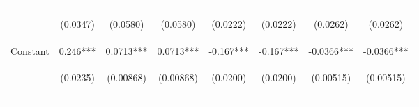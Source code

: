 \documentclass[]{article}
\begin{document}
\begin{center}
\begin{tabular}{lccccccc}
\vspace{4pt} & \begin{footnotesize}(0.0347)\end{footnotesize} & \begin{footnotesize}(0.0580)\end{footnotesize} & \begin{footnotesize}(0.0580)\end{footnotesize} & \begin{footnotesize}(0.0222)\end{footnotesize} & \begin{footnotesize}(0.0222)\end{footnotesize} & \begin{footnotesize}(0.0262)\end{footnotesize} & \begin{footnotesize}(0.0262)\end{footnotesize} \\
Constant & 0.246*** & 0.0713*** & 0.0713*** & -0.167*** & -0.167*** & -0.0366*** & -0.0366*** \\
 & \begin{footnotesize}(0.0235)\end{footnotesize} & \begin{footnotesize}(0.00868)\end{footnotesize} & \begin{footnotesize}(0.00868)\end{footnotesize} & \begin{footnotesize}(0.0200)\end{footnotesize} & \begin{footnotesize}(0.0200)\end{footnotesize} & \begin{footnotesize}(0.00515)\end{footnotesize} & \begin{footnotesize}(0.00515)\end{footnotesize} \\
\vspace{4pt} & \begin{footnotesize}\end{footnotesize} & \begin{footnotesize}\end{footnotesize} & \begin{footnotesize}\end{footnotesize} & \begin{footnotesize}\end{footnotesize} & \begin{footnotesize}\end{footnotesize} & \begin{footnotesize}\end{footnotesize} & \begin{footnotesize}\end{footnotesize} \\

\end{tabular}
\end{center}
\end{document}
